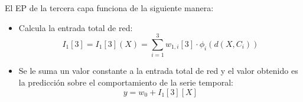%
El EP de la tercera capa funciona de la siguiente manera:
\begin{itemize}
\item Calcula la entrada total de red:
\begin{displaymath}
I_1[3] = I_1[3](X) = \sum_{i=1}^3 w_{1,i}[3]\cdot \phi_i(d(X,C_i))
\end{displaymath}
\item Se le suma un valor constante a la entrada total de red y el valor
obtenido es la predicci\'on sobre el comportamiento de la serie temporal:
\begin{displaymath}
y = w_0+I_1[3][X]
\end{displaymath}
\end{itemize}
